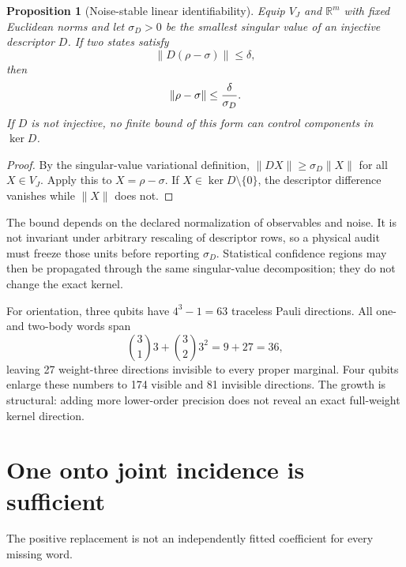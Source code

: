 \documentclass[11pt]{article}
\newtheorem{proposition}{Proposition}
\begin{document}
\begin{proposition}[Noise-stable linear identifiability]
Equip \(V_J\) and \(\mathbb R^m\) with fixed Euclidean norms and let
\(\sigma_D>0\) be the smallest singular value of an injective descriptor
\(D\).  If two states satisfy
\begin{equation}
 \lVert D(\rho-\sigma)\rVert\le\delta,
 \label{eq:noisy-descriptor}
\end{equation}
then
\begin{equation}
 \lVert\rho-\sigma\rVert\le{\delta\over\sigma_D}.
 \label{eq:descriptor-stability}
\end{equation}
If \(D\) is not injective, no finite bound of this form can control components
in \(\ker D\).
\end{proposition}
\begin{proof}
By the singular-value variational definition,
\(\lVert DX\rVert\ge\sigma_D\lVert X\rVert\) for all \(X\in V_J\).
Apply this to \(X=\rho-\sigma\).  If \(X\in\ker D\setminus\{0\}\), the
descriptor difference vanishes while \(\lVert X\rVert\) does not.
\end{proof}

The bound depends on the declared normalization of observables and noise.  It
is not invariant under arbitrary rescaling of descriptor rows, so a physical
audit must freeze those units before reporting \(\sigma_D\).  Statistical
confidence regions may then be propagated through the same singular-value
decomposition; they do not change the exact kernel.

For orientation, three qubits have \(4^3-1=63\) traceless Pauli directions.
All one- and two-body words span
\begin{equation}
 {3\choose1}3+{3\choose2}3^2=9+27=36,
\end{equation}
leaving 27 weight-three directions invisible to every proper marginal.  Four
qubits enlarge these numbers to 174 visible and 81 invisible directions.  The
growth is structural: adding more lower-order precision does not reveal an
exact full-weight kernel direction.

\section{One onto joint incidence is sufficient}

The positive replacement is not an independently fitted coefficient for every
missing word.
\end{document}
